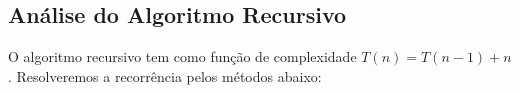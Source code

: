 \subsection{Análise do Algoritmo Recursivo}
O algoritmo recursivo tem como função de complexidade $T(n) = T(n - 1) + n$. Resolveremos a recorrência pelos métodos abaixo:




